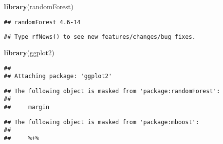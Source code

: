 \documentclass[]{article}
\newenvironment{Shaded}{\begin{snugshade}}{\end{snugshade}}
\newcommand{\KeywordTok}[1]{\textcolor[rgb]{0.13,0.29,0.53}{\textbf{#1}}}
\newcommand{\DataTypeTok}[1]{\textcolor[rgb]{0.13,0.29,0.53}{#1}}
\newcommand{\DecValTok}[1]{\textcolor[rgb]{0.00,0.00,0.81}{#1}}
\newcommand{\FloatTok}[1]{\textcolor[rgb]{0.00,0.00,0.81}{#1}}
\newcommand{\StringTok}[1]{\textcolor[rgb]{0.31,0.60,0.02}{#1}}
\newcommand{\OperatorTok}[1]{\textcolor[rgb]{0.81,0.36,0.00}{\textbf{#1}}}
\newcommand{\NormalTok}[1]{#1}
\begin{document}
\begin{Shaded}
\begin{Highlighting}[]
\KeywordTok{library}\NormalTok{(randomForest)}
\end{Highlighting}
\end{Shaded}

\begin{verbatim}
## randomForest 4.6-14
\end{verbatim}

\begin{verbatim}
## Type rfNews() to see new features/changes/bug fixes.
\end{verbatim}

\begin{Shaded}
\begin{Highlighting}[]
\KeywordTok{library}\NormalTok{(ggplot2)}
\end{Highlighting}
\end{Shaded}

\begin{verbatim}
## 
## Attaching package: 'ggplot2'
\end{verbatim}

\begin{verbatim}
## The following object is masked from 'package:randomForest':
## 
##     margin
\end{verbatim}

\begin{verbatim}
## The following object is masked from 'package:mboost':
## 
##     %+%
\end{verbatim}

\begin{Shaded}
\end{Shaded}
\end{document}
